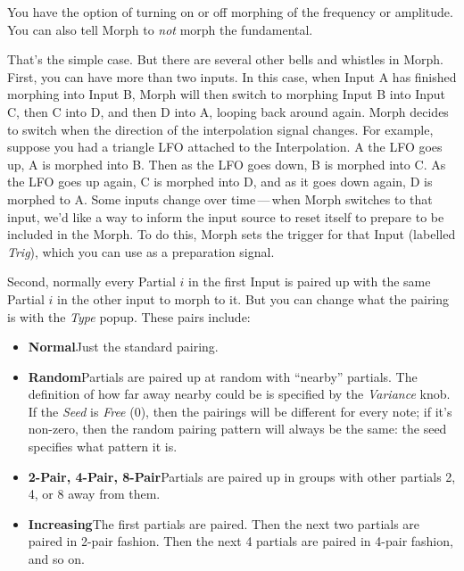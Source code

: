 \documentclass{article}
\begin{document}
You have the option of turning on or off morphing of the frequency or amplitude.  You can also tell Morph to {\it not} morph the fundamental.  

That's the simple case.  But there are several other bells and whistles in Morph.  First, you can have more than two inputs.  In this case, when Input A has finished morphing into Input B, Morph will then switch to morphing Input B into Input C, then C into D, and then D into A, looping back around again.  Morph decides to switch when the direction of the interpolation signal changes.  For example, suppose you had a triangle LFO attached to the Interpolation.  A the LFO goes up, A is morphed into B.  Then as the LFO goes down, B is morphed into C.  As the LFO goes up again, C is morphed into D, and as it goes down again, D is morphed to A.  Some inputs change over time\,---\,when Morph switches to that input, we'd like a way to inform the input source to reset itself to prepare to be included in the Morph.  To do this, Morph sets the trigger for that Input (labelled {\it Trig}), which you can use as a preparation signal.

Second, normally every Partial \(i\) in the first Input is paired up with the same Partial \(i\) in the other input to morph to it.  But you can change what the pairing is with the {\it Type} popup.  These pairs include:

\begin{itemize}
\item {\bf Normal}\qquad Just the standard pairing.
\item {\bf Random}\qquad Partials are paired up at random with ``nearby'' partials.  The definition of how far away nearby could be is specified by the {\it Variance} knob.  If the {\it Seed} is {\it Free} (0), then the pairings will be different for every note; if it's non-zero, then the random pairing pattern will always be the same: the seed specifies what pattern it is.
\item {\bf 2-Pair, 4-Pair, 8-Pair}\qquad Partials are paired up in groups with other partials 2, 4, or 8 away from them.
\item {\bf Increasing}\qquad The first partials are paired.  Then the next two partials are paired in 2-pair fashion.  Then the next 4 partials are paired in 4-pair fashion, and so on.
\end{itemize}

\end{document}
